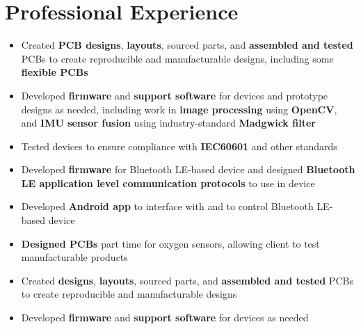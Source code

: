 \documentclass{my_resume}
\begin{document}
\section{Professional Experience}
\begin{flushleft}
  \begin{itemize}[noitemsep]
  \item Created \textbf{PCB designs}, \textbf{layouts}, sourced parts, and \textbf{assembled and tested} PCBs to create reproducible and manufacturable designs, including some \textbf{flexible PCBs}
  \item Developed \textbf{firmware} and \textbf{support software} for devices and prototype designs as needed, including work in \textbf{image processing} using \textbf{OpenCV}, and \textbf{IMU sensor fusion} using industry-standard \textbf{Madgwick filter}
  \item Tested devices to ensure compliance with \textbf{IEC60601} and other standards
\end{itemize}
\end{flushleft}
\begin{flushleft}
  \begin{itemize}[noitemsep]
  \item Developed \textbf{firmware} for Bluetooth LE-based device and designed \textbf{Bluetooth LE application level communication protocols} to use in device
  \item Developed \textbf{Android app} to interface with and to control Bluetooth LE-based device
\end{itemize}
\end{flushleft}
\begin{flushleft}
  \begin{itemize}[noitemsep]
  \item \textbf{Designed PCBs} part time for oxygen sensors, allowing client to test manufacturable products
  \item Created \textbf{designs}, \textbf{layouts}, sourced parts, and \textbf{assembled and tested} PCBs to create reproducible and manufacturable designs
  \item Developed \textbf{firmware} and \textbf{support software} for devices as needed
\end{itemize}
\end{flushleft}
\end{document}
